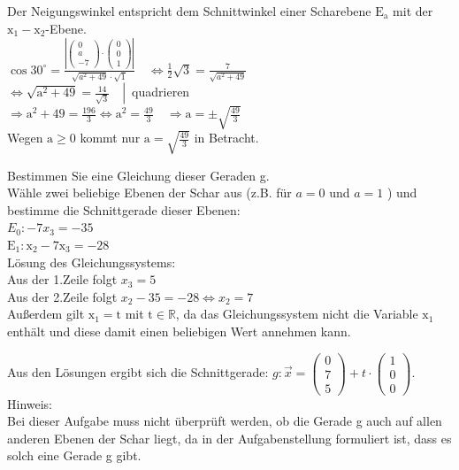 \documentclass[10pt]{article}
\begin{document}
Der Neigungswinkel entspricht dem Schnittwinkel einer Scharebene $\mathrm{E}_{\mathrm{a}}$ mit der $\mathrm{x}_{1}-\mathrm{x}_{2}$-Ebene.\\
$\cos 30^{\circ}=\frac{\left|\left(\begin{array}{c}0 \\ a \\ -7\end{array}\right) \cdot\left(\begin{array}{l}0 \\ 0 \\ 1\end{array}\right)\right|}{\sqrt{a^{2}+49} \cdot \sqrt{1}} \quad \Leftrightarrow \frac{1}{2} \sqrt{3}=\frac{7}{\sqrt{a^{2}+49}}$\\
$\left.\Leftrightarrow \sqrt{\mathrm{a}^{2}+49}=\frac{14}{\sqrt{3}} \quad \right\rvert\,$ quadrieren\\
$\Rightarrow \mathrm{a}^{2}+49=\frac{196}{3} \Leftrightarrow \mathrm{a}^{2}=\frac{49}{3} \quad \Rightarrow \mathrm{a}= \pm \sqrt{\frac{49}{3}}$\\
Wegen $\mathrm{a} \geq 0$ kommt nur $\mathrm{a}=\sqrt{\frac{49}{3}}$ in Betracht.

Bestimmen Sie eine Gleichung dieser Geraden g.\\
Wähle zwei beliebige Ebenen der Schar aus (z.B. für $a=0$ und $a=1$ ) und bestimme die Schnittgerade dieser Ebenen:\\
$E_{0}:-7 x_{3}=-35$\\
$\mathrm{E}_{1}: \mathrm{x}_{2}-7 \mathrm{x}_{3}=-28$\\
Lösung des Gleichungssystems:\\
Aus der 1.Zeile folgt $x_{3}=5$\\
Aus der 2.Zeile folgt $x_{2}-35=-28 \Leftrightarrow x_{2}=7$\\
Außerdem gilt $\mathrm{x}_{1}=\mathrm{t}$ mit $\mathrm{t} \in \mathbb{R}$, da das Gleichungssystem nicht die Variable $\mathrm{x}_{1}$ enthält und diese damit einen beliebigen Wert annehmen kann.

Aus den Lösungen ergibt sich die Schnittgerade: $g: \vec{x}=\left(\begin{array}{l}0 \\ 7 \\ 5\end{array}\right)+t \cdot\left(\begin{array}{l}1 \\ 0 \\ 0\end{array}\right)$.\\
Hinweis:\\
Bei dieser Aufgabe muss nicht überprüft werden, ob die Gerade g auch auf allen anderen Ebenen der Schar liegt, da in der Aufgabenstellung formuliert ist, dass es solch eine Gerade g gibt.
\end{document}
